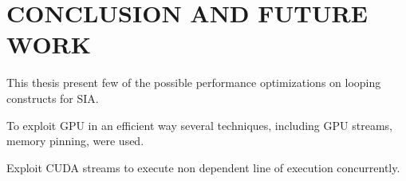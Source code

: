 \chapter{CONCLUSION AND FUTURE WORK} \label{intro}

This thesis present few of the possible performance optimizations on looping
constructs for SIA.

To exploit GPU in an efficient way several techniques, including GPU streams,
memory pinning, were used.

Exploit CUDA streams to execute non dependent line of execution concurrently.